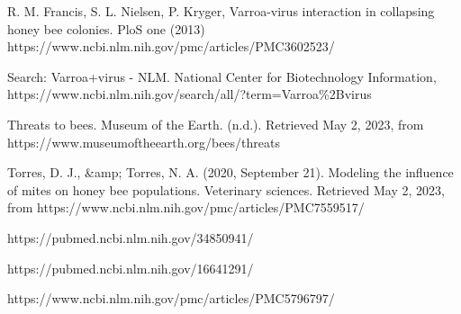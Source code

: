 \documentclass[final,5p,times,twocolumn,authoryear]{elsarticle}
\begin{document}
 R. M. Francis, S. L. Nielsen, P. Kryger, Varroa-virus interaction in collapsing honey bee colonies. PloS one (2013) https://www.ncbi.nlm.nih.gov/pmc/articles/PMC3602523/

 Search: Varroa+virus - NLM. National Center for Biotechnology Information, https://www.ncbi.nlm.nih.gov/search/all/?term=Varroa\%2Bvirus 

Threats to bees. Museum of the Earth. (n.d.). Retrieved May 2, 2023, from https://www.museumoftheearth.org/bees/threats 

Torres, D. J., \&amp; Torres, N. A. (2020, September 21). Modeling the influence of mites on honey bee populations. Veterinary sciences. Retrieved May 2, 2023, from https://www.ncbi.nlm.nih.gov/pmc/articles/PMC7559517/ 

 https://pubmed.ncbi.nlm.nih.gov/34850941/

 https://pubmed.ncbi.nlm.nih.gov/16641291/

 https://www.ncbi.nlm.nih.gov/pmc/articles/PMC5796797/



 
 
\appendix

 







\end{document}
